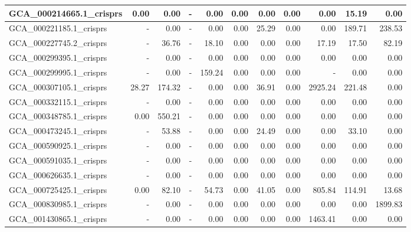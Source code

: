 \documentclass[12pt,a4paper]{article}
\begin{document}
\begin{table}[ht]
\begin{center}
\begin{tabular}{|l*{10}{|r}|}
GCA\_000214665.1\_crisprs & 0.00 & 0.00 & - & 0.00 & 0.00 & 0.00 & 0.00 & 0.00 & 15.19 & 0.00 \\ \hline
GCA\_000221185.1\_crisprs & - & 0.00 & - & 0.00 & 0.00 & 25.29 & 0.00 & 0.00 & 189.71 & 238.53 \\ \hline
GCA\_000227745.2\_crisprs & - & 36.76 & - & 18.10 & 0.00 & 0.00 & 0.00 & 17.19 & 17.50 & 82.19 \\ \hline
GCA\_000299395.1\_crisprs & - & 0.00 & - & 0.00 & 0.00 & 0.00 & 0.00 & 0.00 & 0.00 & 0.00 \\ \hline
GCA\_000299995.1\_crisprs & - & 0.00 & - & 159.24 & 0.00 & 0.00 & 0.00 & - & 0.00 & 0.00 \\ \hline
GCA\_000307105.1\_crisprs & 28.27 & 174.32 & - & 0.00 & 0.00 & 36.91 & 0.00 & 2925.24 & 221.48 & 0.00 \\ \hline
GCA\_000332115.1\_crisprs & - & 0.00 & - & 0.00 & 0.00 & 0.00 & 0.00 & 0.00 & 0.00 & 0.00 \\ \hline
GCA\_000348785.1\_crisprs & 0.00 & 550.21 & - & 0.00 & 0.00 & 0.00 & 0.00 & 0.00 & 0.00 & 0.00 \\ \hline
GCA\_000473245.1\_crisprs & - & 53.88 & - & 0.00 & 0.00 & 24.49 & 0.00 & 0.00 & 33.10 & 0.00 \\ \hline
GCA\_000590925.1\_crisprs & - & 0.00 & - & 0.00 & 0.00 & 0.00 & 0.00 & 0.00 & 0.00 & 0.00 \\ \hline
GCA\_000591035.1\_crisprs & - & 0.00 & - & 0.00 & 0.00 & 0.00 & 0.00 & 0.00 & 0.00 & 0.00 \\ \hline
GCA\_000626635.1\_crisprs & - & 0.00 & - & 0.00 & 0.00 & 0.00 & 0.00 & 0.00 & 0.00 & 0.00 \\ \hline
GCA\_000725425.1\_crisprs & 0.00 & 82.10 & - & 54.73 & 0.00 & 41.05 & 0.00 & 805.84 & 114.91 & 13.68 \\ \hline
GCA\_000830985.1\_crisprs & - & 0.00 & - & 0.00 & 0.00 & 0.00 & 0.00 & 0.00 & 0.00 & 1899.83 \\ \hline
GCA\_001430865.1\_crisprs & - & 0.00 & - & 0.00 & 0.00 & 0.00 & 0.00 & 1463.41 & 0.00 & 0.00 \\ \hline
\end{tabular}
\end{center}
\end{table}
\end{document}
